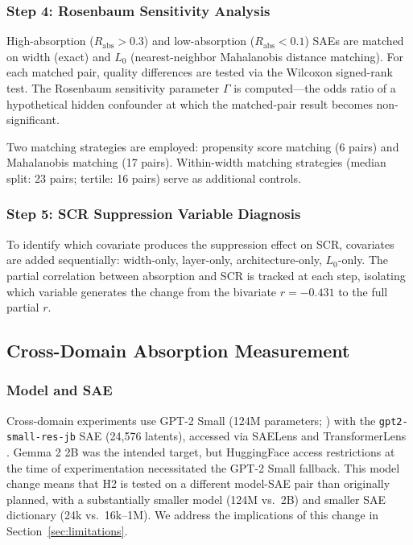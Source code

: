 \documentclass{article}
\begin{document}
\subsubsection{Step 4: Rosenbaum Sensitivity Analysis}

High-absorption ($R_{\text{abs}} > 0.3$) and low-absorption ($R_{\text{abs}} < 0.1$) SAEs are matched on width (exact) and $L_0$ (nearest-neighbor Mahalanobis distance matching).
For each matched pair, quality differences are tested via the Wilcoxon signed-rank test.
The Rosenbaum sensitivity parameter $\Gamma$ is computed---the odds ratio of a hypothetical hidden confounder at which the matched-pair result becomes non-significant.

Two matching strategies are employed: propensity score matching (6 pairs) and Mahalanobis matching (17 pairs).
Within-width matching strategies (median split: 23 pairs; tertile: 16 pairs) serve as additional controls.

\subsubsection{Step 5: SCR Suppression Variable Diagnosis}

To identify which covariate produces the suppression effect on SCR, covariates are added sequentially: width-only, layer-only, architecture-only, $L_0$-only.
The partial correlation between absorption and SCR is tracked at each step, isolating which variable generates the change from the bivariate $r = -0.431$ to the full partial $r$.

\subsection{Cross-Domain Absorption Measurement}
\label{sec:crossdomain}

\subsubsection{Model and SAE}

Cross-domain experiments use GPT-2 Small (124M parameters; \citealp{radford2019language}) with the \texttt{gpt2-small-res-jb} SAE (24,576 latents), accessed via SAELens \citep{bloom2024saelens} and TransformerLens \citep{nanda2022transformerlens}.
Gemma 2 2B was the intended target, but HuggingFace access restrictions at the time of experimentation necessitated the GPT-2 Small fallback.
This model change means that H2 is tested on a different model-SAE pair than originally planned, with a substantially smaller model (124M vs.\ 2B) and smaller SAE dictionary (24k vs.\ 16k--1M).
We address the implications of this change in Section~\ref{sec:limitations}.
\end{document}
